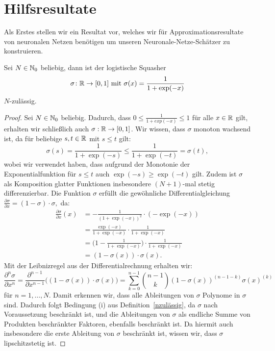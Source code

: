 \section{Hilfsresultate}
Als Erstes stellen wir ein Resultat vor, welches wir für Approximationsresultate von neuronalen Netzen benötigen um unseren Neuronale-Netze-Schätzer zu konstruieren.
\begin{lem}
\label{lem:logsquasher}
Sei $N \in \mathbb{N}_0$ beliebig, dann ist der logistische Squasher $$\sigma\colon \mathbb{R} \to [0, 1] \text{ mit } \sigma(x) = \frac{1}{1 + \exp(-x)}$$ $N$-zulässig.
\end{lem}
\begin{proof}
Sei $N \in \mathbb{N}_0$ beliebig. Dadurch, dass $0 \leq \frac{1}{1 + exp(-x)} \leq 1$ für alle $x \in \mathbb{R}$ gilt, erhalten wir schließlich auch $\sigma: \mathbb{R} \to [0,1]$. Wir wissen, dass $\sigma$ monoton wachsend ist, da für beliebige $s, t \in \mathbb{R}$ mit $s \leq t$ gilt:
$$\sigma(s) = \frac{1}{1 + \exp(-s)} \leq \frac{1}{1 + \exp(-t)} = \sigma(t),$$
wobei wir verwendet haben, dass aufgrund der Monotonie der Exponentialfunktion für $s \leq t$ auch $\exp(-s) \geq \exp(-t)$ gilt.
Zudem ist $\sigma$ als Komposition glatter Funktionen insbesondere $(N + 1)$-mal stetig differenzierbar. Die Funktion $\sigma$ erfüllt die gewöhnliche Differentialgleichung $\frac{\partial\sigma}{\partial x} = (1 - \sigma) \cdot \sigma,$ da:
\begin{equation*}
\begin{split}
\frac{\partial \sigma}{\partial x}(x) &= -\frac{1}{(1 + \exp(-x))^2} \cdot (-\exp(-x)) \\
& = \frac{\exp(-x)}{1 + \exp(-x)} \cdot \frac{1}{1 + \exp(-x)} \\
& = \bigg(1 - \frac{1}{1 + \exp(-x)}\bigg) \cdot \frac{1}{1 + \exp(-x)} \\
& = (1 - \sigma(x)) \cdot \sigma(x).
\end{split}
\end{equation*}
Mit der Leibnizregel aus der Differentialrechnung erhalten wir:
\begin{equation}
\label{eq:leibniz}
\frac{\partial^n\sigma}{\partial x^n} = \frac{\partial^{n - 1}}{\partial x^{n - 1}}\bigg((1 - \sigma(x)) \cdot \sigma(x)\bigg) = \sum_{k = 0}^{n-1}\binom{n - 1}{k}(1 - \sigma(x))^{(n - 1 - k)}  \sigma(x)^{(k)} 
\end{equation}
für $n = 1,\dots,N$. 
Damit erkennen wir, dass alle Ableitungen von $\sigma$ Polynome in $\sigma$ sind. Dadurch folgt Bedingung (i) aus Definition~\ref{nzulässig}, da $\sigma$ nach Voraussetzung beschränkt ist, und die Ableitungen von $\sigma$ als endliche Summe von Produkten beschränkter Faktoren, ebenfalls beschränkt ist. Da hiermit auch insbesondere die erste Ableitung von $\sigma$ beschränkt ist, wissen wir, dass $\sigma$ lipschitzstetig ist.


\end{proof}
